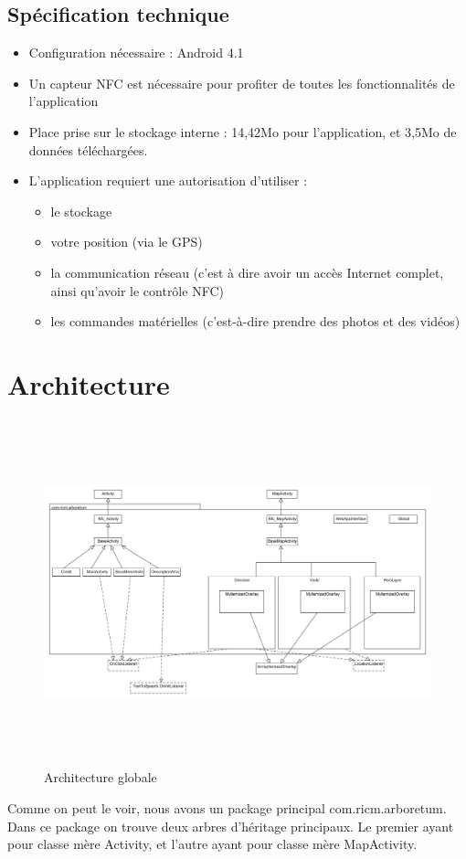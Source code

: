 \documentclass[a4paper,11pt]{article}
\begin{document}
    \subsection{Spécification technique}
      \begin{itemize}
       \item Configuration nécessaire : Android 4.1
       \item Un capteur NFC est nécessaire pour profiter de toutes les fonctionnalités de l'application
       \item Place prise sur le stockage interne : 14,42Mo pour l'application, et 3,5Mo de données téléchargées.
       \item L'application requiert une autorisation d'utiliser : 
     \begin{itemize}
      \item le stockage
      \item votre position (via le GPS)
      \item la communication réseau (c'est à dire avoir un accès Internet complet, ainsi qu'avoir le contrôle NFC)
      \item les commandes matérielles (c'est-à-dire prendre des photos et des vidéos)
     \end{itemize}
      \end{itemize}

   \section{Architecture}
    \begin{figure}[H]
     \begin{center}
      \includegraphics[width=18cm,height=10cm]{archi.jpg}
      \caption{Architecture globale}
     \end{center}
    \end{figure}
    Comme on peut le voir, nous avons un package principal com.ricm.arboretum. Dans ce package on trouve deux arbres d'héritage principaux. Le premier 
    ayant pour classe mère Activity, et l'autre ayant pour classe mère MapActivity.
    
\end{document}
